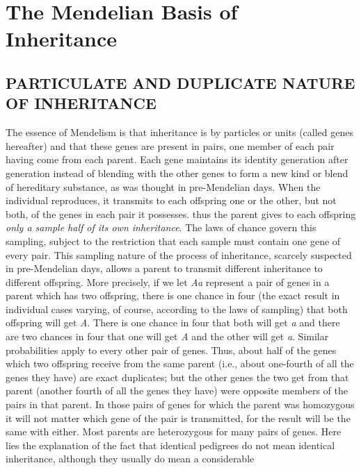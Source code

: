 \chapter{The Mendelian Basis of Inheritance}
\label{cha:mendelian-basis-of-inheritance}

\section*{PARTICULATE AND DUPLICATE NATURE OF INHERITANCE}

The essence of Mendelism is that inheritance is by particles or units
(called genes hereafter) and that these genes are present in pairs, one
member of each pair having come from each parent. Each gene maintains
its identity generation after generation instead of blending with
the other genes to form a new kind or blend of
hereditary substance, as
was thought in pre-Mendelian days. When the individual reproduces,
it transmits to each offspring one or the other, but not both, of the
genes in each pair it possesses. thus the parent gives to each offspring
\textit{only a sample half of its own inheritance}. The laws of chance govern
this sampling, subject to the restriction that each sample must contain
one gene of every pair. This sampling nature of the process of inheritance,
scarcely suspected in pre-Mendelian days, allows a parent to transmit
different inheritance to different offspring. More precisely, if we
let \textit{Aa} represent a pair of genes in a parent which has two offspring,
there is one chance in four (the exact result in individual cases varying,
of course, according to the laws of sampling) that both offspring will
get \textit{A}. There is one chance in four that both will get \textit{a} and there are two
chances in four that one will get \textit{A} and the other will get \textit{a}. Similar
probabilities apply to every other pair of genes. Thus, about half of the
genes which two offspring receive from the same parent (i.e., about
one-fourth of all the genes they have) are exact duplicates; but the
other genes the two get from that parent (another fourth of all the
genes they have) were opposite members of the pairs in that parent. In
those pairs of genes for which the parent was homozygous it will not
matter which gene of the pair is transmitted, for the result will be the
same with either. Most parents are heterozygous for many pairs of
genes. Here lies the explanation of the fact that identical pedigrees do
not mean identical inheritance, although they usually do mean a considerable
